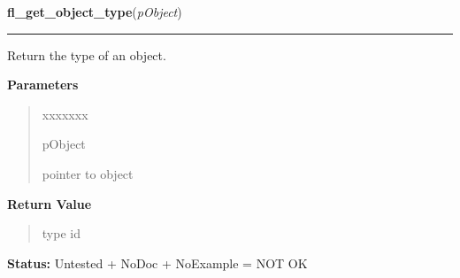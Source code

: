\hspace{.8\funcindent}\begin{boxedminipage}{\funcwidth}

    \raggedright \textbf{fl\_get\_object\_type}(\textit{pObject})

    \vspace{-1.5ex}

    \rule{\textwidth}{0.5\fboxrule}
\setlength{\parskip}{2ex}
    Return the type of an object.

\setlength{\parskip}{1ex}
      \textbf{Parameters}
      \vspace{-1ex}

      \begin{quote}
        \begin{Ventry}{xxxxxxx}

          \item[pObject]

          pointer to object

        \end{Ventry}

      \end{quote}

      \textbf{Return Value}
    \vspace{-1ex}

      \begin{quote}
      type id

      \end{quote}

\textbf{Status:} Untested + NoDoc + NoExample = NOT OK



    \end{boxedminipage}

    \label{xformslib:library:fl_set_object_boxtype}

    \vspace{0.5ex}

